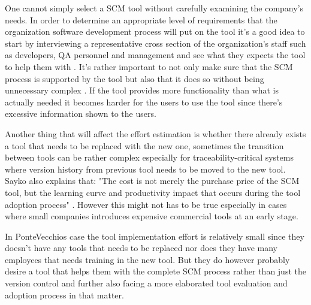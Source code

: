 \documentclass[10pt]{article}
\begin{document}
\noindent One cannot simply select a SCM tool without carefully examining the company's needs. In order to determine an appropriate level of requirements that the organization software development process will put on the tool it's a good idea to start by interviewing a representative cross section of the organization's staff such as developers, QA personnel and management and see what they expects the tool to help them with \cite{Sayko}.
It's rather important to not only make sure that the SCM process is supported by the tool but also that it does so without being unnecessary complex \cite{ABB}. If the tool provides more functionality than what is actually needed it becomes harder for the users to use the tool since there's excessive information shown to the users.

\noindent Another thing that will affect the effort estimation is whether there already exists a tool that needs to be replaced with the new one, sometimes the transition between tools can be rather complex especially for traceability-critical systems where version history from previous tool needs to be moved to the new tool. Sayko also explains that: "The cost is not merely the purchase price of the SCM tool, but the learning curve and productivity impact that occurs during the tool adoption process" \cite{Sayko}. However this might not has to be true especially in cases where small companies introduces expensive commercial tools at an early stage.

\noindent In PonteVecchios case the tool implementation effort is relatively small since they doesn't have any tools that needs to be replaced nor does they have many employees that needs training in the new tool. But they do however probably desire a tool that helps them with the complete SCM process rather than just the version control and further also facing a more elaborated tool evaluation and adoption process in that matter.
\end{document}
